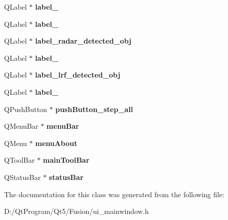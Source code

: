 \begin{DoxyCompactItemize}
\item 
\hypertarget{class_ui___main_window_ac1cbc41e9dbaeb3d0bdc2189d8e9ee1d}{}Q\+Label $\ast$ {\bfseries label\+\_}\label{class_ui___main_window_ac1cbc41e9dbaeb3d0bdc2189d8e9ee1d}

\item 
\hypertarget{class_ui___main_window_a1826c056a71021d686f689b8422f5994}{}Q\+Label $\ast$ {\bfseries label\+\_}\label{class_ui___main_window_a1826c056a71021d686f689b8422f5994}

\item 
\hypertarget{class_ui___main_window_a5bc7693b412a4ae2af3be27725829483}{}Q\+Label $\ast$ {\bfseries label\+\_\+radar\+\_\+detected\+\_\+obj}\label{class_ui___main_window_a5bc7693b412a4ae2af3be27725829483}

\item 
\hypertarget{class_ui___main_window_a1c16c0a684617927472e534822a63c7d}{}Q\+Label $\ast$ {\bfseries label\+\_}\label{class_ui___main_window_a1c16c0a684617927472e534822a63c7d}

\item 
\hypertarget{class_ui___main_window_a4177d115d86cf0239b978f2ebb725423}{}Q\+Label $\ast$ {\bfseries label\+\_\+lrf\+\_\+detected\+\_\+obj}\label{class_ui___main_window_a4177d115d86cf0239b978f2ebb725423}

\item 
\hypertarget{class_ui___main_window_aa2621565827195e88436fb54220bb48d}{}Q\+Label $\ast$ {\bfseries label\+\_}\label{class_ui___main_window_aa2621565827195e88436fb54220bb48d}

\item 
\hypertarget{class_ui___main_window_a6e51addfd848e5c11397f6329f43c017}{}Q\+Push\+Button $\ast$ {\bfseries push\+Button\+\_\+step\+\_\+all}\label{class_ui___main_window_a6e51addfd848e5c11397f6329f43c017}

\item 
\hypertarget{class_ui___main_window_a2be1c24ec9adfca18e1dcc951931457f}{}Q\+Menu\+Bar $\ast$ {\bfseries menu\+Bar}\label{class_ui___main_window_a2be1c24ec9adfca18e1dcc951931457f}

\item 
\hypertarget{class_ui___main_window_aa11a672d324fa5c42a5dc488e99bc216}{}Q\+Menu $\ast$ {\bfseries menu\+About}\label{class_ui___main_window_aa11a672d324fa5c42a5dc488e99bc216}

\item 
\hypertarget{class_ui___main_window_a5172877001c8c7b4e0f6de50421867d1}{}Q\+Tool\+Bar $\ast$ {\bfseries main\+Tool\+Bar}\label{class_ui___main_window_a5172877001c8c7b4e0f6de50421867d1}

\item 
\hypertarget{class_ui___main_window_a50fa481337604bcc8bf68de18ab16ecd}{}Q\+Status\+Bar $\ast$ {\bfseries status\+Bar}\label{class_ui___main_window_a50fa481337604bcc8bf68de18ab16ecd}

\end{DoxyCompactItemize}


The documentation for this class was generated from the following file\+:\begin{DoxyCompactItemize}
\item 
D\+:/\+Qt\+Program/\+Qt5/\+Fusion/ui\+\_\+mainwindow.\+h\end{DoxyCompactItemize}

